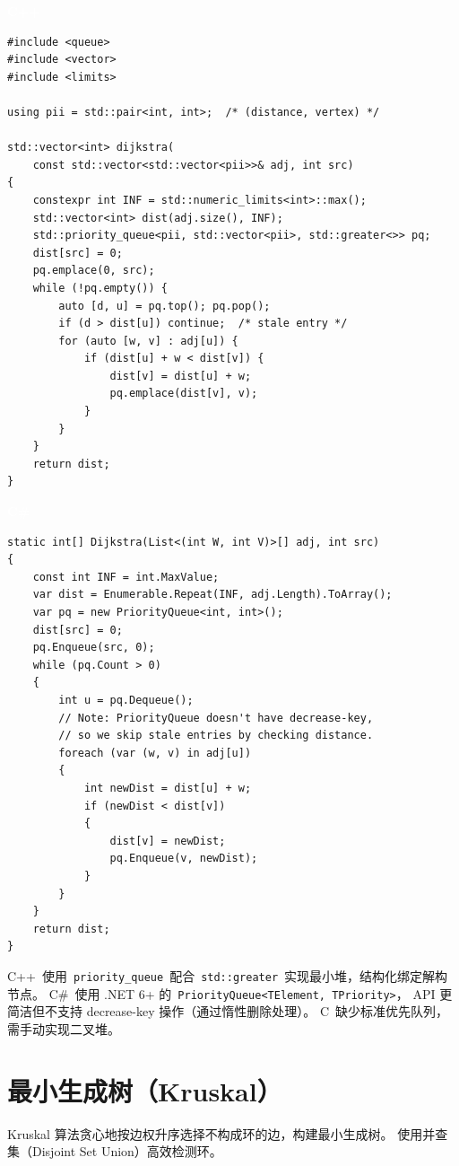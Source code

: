 \documentclass[12pt,a4paper,fontset=fandol]{ctexbook}
\newcommand{\cpplabel}{%
  \noindent\begin{tcolorbox}[sharp corners,colback=cppheadbg,colframe=cppheadbg,
    left=6pt,right=6pt,top=2pt,bottom=2pt,boxrule=0pt]
  \textcolor{white}{\small\bfseries\sffamily C++}\end{tcolorbox}%
}
\newcommand{\csharplabel}{%
  \noindent\begin{tcolorbox}[sharp corners,colback=csharpheadbg,colframe=csharpheadbg,
    left=6pt,right=6pt,top=2pt,bottom=2pt,boxrule=0pt]
  \textcolor{white}{\small\bfseries\sffamily C\#}\end{tcolorbox}%
}
\newcommand{\Tp}[1]{\texttt{#1}}
\begin{document}
\cpplabel
\begin{lstlisting}[style=cppstyle]
#include <queue>
#include <vector>
#include <limits>

using pii = std::pair<int, int>;  /* (distance, vertex) */

std::vector<int> dijkstra(
    const std::vector<std::vector<pii>>& adj, int src)
{
    constexpr int INF = std::numeric_limits<int>::max();
    std::vector<int> dist(adj.size(), INF);
    std::priority_queue<pii, std::vector<pii>, std::greater<>> pq;
    dist[src] = 0;
    pq.emplace(0, src);
    while (!pq.empty()) {
        auto [d, u] = pq.top(); pq.pop();
        if (d > dist[u]) continue;  /* stale entry */
        for (auto [w, v] : adj[u]) {
            if (dist[u] + w < dist[v]) {
                dist[v] = dist[u] + w;
                pq.emplace(dist[v], v);
            }
        }
    }
    return dist;
}
\end{lstlisting}

\csharplabel
\begin{lstlisting}[style=csharpstyle]
static int[] Dijkstra(List<(int W, int V)>[] adj, int src)
{
    const int INF = int.MaxValue;
    var dist = Enumerable.Repeat(INF, adj.Length).ToArray();
    var pq = new PriorityQueue<int, int>();
    dist[src] = 0;
    pq.Enqueue(src, 0);
    while (pq.Count > 0)
    {
        int u = pq.Dequeue();
        // Note: PriorityQueue doesn't have decrease-key,
        // so we skip stale entries by checking distance.
        foreach (var (w, v) in adj[u])
        {
            int newDist = dist[u] + w;
            if (newDist < dist[v])
            {
                dist[v] = newDist;
                pq.Enqueue(v, newDist);
            }
        }
    }
    return dist;
}
\end{lstlisting}

\begin{compare}
C++~使用~\Tp{priority\_queue}~配合~\Tp{std::greater}~实现最小堆，结构化绑定解构节点。
C\#~使用 .NET 6+ 的~\Tp{PriorityQueue<TElement, TPriority>}，
API 更简洁但不支持 decrease-key 操作（通过惰性删除处理）。
C~缺少标准优先队列，需手动实现二叉堆。
\end{compare}

\chapter{最小生成树（Kruskal）}

Kruskal 算法贪心地按边权升序选择不构成环的边，构建最小生成树。
使用并查集（Disjoint Set Union）高效检测环。
\end{document}
